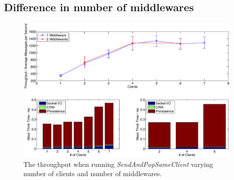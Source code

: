 \documentclass{article}
\begin{document}
        \subsection{Difference in number of middlewares}
            \begin{figure}[H]
                \hspace{-1.5cm}
                \includegraphics[scale=0.40]{throughout-thinktime_middleware_clients}
                \caption{The throughput when running \textit{SendAndPopSameClient} varying number of clients and number of middlewares.}
                \label{fig:throughput_middleware_clients}
                \end{figure}
\end{document}
